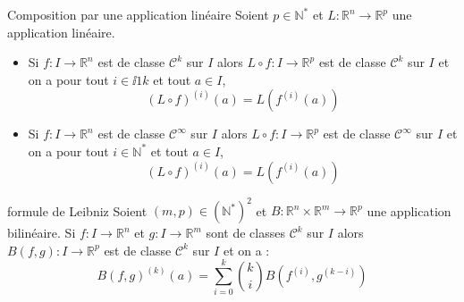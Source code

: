 \documentclass[french,11pt,twoside]{VcCours}
\begin{document}
\begin{Proposition}{Composition par une application linéaire}
Soient $p \in \mathbb{N}^*$ et $L : \mathbb{R}^n \rightarrow \mathbb{R}^p$ une application linéaire. 
\begin{itemize}
\item Si $f : I \rightarrow \mathbb{R}^n$ est de classe $\mathcal{C}^k$ sur $I$ alors $L \circ f : I \rightarrow \mathbb{R}^p$ est de classe $\mathcal{C}^k$ sur $I$ et on a pour tout $i \in \ii{1}{k}$ et tout $a \in I$,
$$ (L \circ f)^{(i)}(a) = L (f^{(i)}(a))$$
\item  Si $f : I \rightarrow \mathbb{R}^n$ est de classe $\mathcal{C}^{\infty}$ sur $I$ alors $L \circ f : I \rightarrow \mathbb{R}^p$ est de classe $\mathcal{C}^{\infty}$ sur $I$ et on a pour tout $i \in \mathbb{N}^*$ et tout $a \in I$,
$$ (L \circ f)^{(i)}(a) = L (f^{(i)}(a))$$
\end{itemize}
\end{Proposition}

\begin{Theoreme}{formule de Leibniz}
Soient $(m,p) \in (\mathbb{N}^*)^2$ et $B : \mathbb{R}^n \times \mathbb{R}^m \rightarrow \mathbb{R}^p$ une application bilinéaire.  Si $f : I \rightarrow \mathbb{R}^n$ et $g : I \rightarrow \mathbb{R}^m$ sont de classes $\mathcal{C}^k$ sur $I$ alors $B(f,g):  I \rightarrow \mathbb{R}^p$ est de classe $\mathcal{C}^k$ sur $I$ et on a :
$$ B(f,g)^{(k)}(a)=  \sum_{i=0}^{k} \binom{k}{i} B(f^{(i)},g^{(k-i)})$$
\end{Theoreme}
\end{document}
